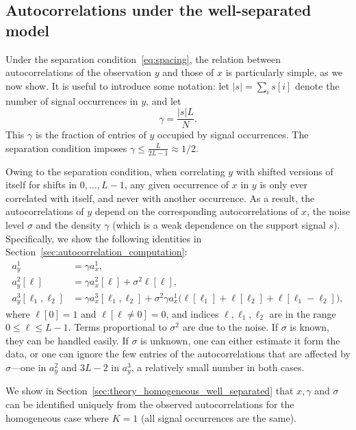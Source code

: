 \documentclass[12pt]{article}
\newcommand{\1}{\mathbf{1}}
\theoremstyle{plain}
\theoremstyle{definition}
\theoremstyle{remark}
\theoremstyle{plain}
\theoremstyle{remark}
\theoremstyle{plain}
\theoremstyle{plain}
\theoremstyle{plain}
\numberwithin{equation}{section}
\begin{document}
\subsection{Autocorrelations under the well-separated model}

Under the separation condition~\eqref{eq:spacing}, the relation between autocorrelations of the observation $y$ and those of $x$ is particularly simple, as we now show. It is useful to introduce some notation: let $\vert s\vert = \sum_i s[i]$ denote the number of signal occurrences in $y$, and let
\begin{equation}
\gamma  = \frac{|s| L}{N}.
\label{eq:gamma}
\end{equation}
This $\gamma$ is the fraction of entries of $y$ occupied by signal occurrences. %
The separation condition  imposes $\gamma\leq\frac{L}{2L-1}\approx 1/2$. 

Owing to the separation condition, when correlating $y$ with shifted versions of itself for shifts in $0, \ldots, L-1$, any given occurrence of $x$ in $y$ is only ever correlated with itself, and never with another occurrence. As a result, the autocorrelations of $y$ depend on the corresponding autocorrelations of $x$, the noise level $\sigma$ and the density $\gamma$ (which is a weak dependence on the support signal $s$). Specifically, we show the following identities in Section~\ref{sec:autocorrelation_computation}:
\begin{align} 
	a_y^1 & = \gamma a_{x}^1, \label{eq:mean_micrograph} \\
	a_y^2[\ell] & = \gamma a_{x}^2[\ell] + \sigma^2\ell[\ell], \label{eq:ac2_micrograph}\\
	a_y^3[\ell_1,\ell_2] & = \gamma a_{x}^3[\ell_1,\ell_2]  + \sigma^2\gamma a_{x}^1  \big(\ell[\ell_1]+\ell[\ell_2]
	+\ell[\ell_1-\ell_2]\big), \label{eq:ac3_micrograph}
\end{align}
where $\ell[0] = 1$ and $\ell[\ell \neq 0] = 0$, and indices $\ell, \ell_1, \ell_2$ are in the range $0 \leq \ell \leq L-1$. Terms proportional to $\sigma^2$ are due to the noise. If $\sigma$ is known, they can be handled easily. If $\sigma$ is unknown, one can either estimate it form the data, or one can ignore the few entries of the autocorrelations that are affected by $\sigma$---one in $a_y^2$ and $3L-2$ in $a_y^3$, a relatively small number in both cases.


We show in Section~\ref{sec:theory_homogeneous_well_separated} 
that $x,\gamma$ and $\sigma$ can be identified uniquely from the observed autocorrelations for the homogeneous case where $K = 1$ (all signal occurrences are the same).
\end{document}
